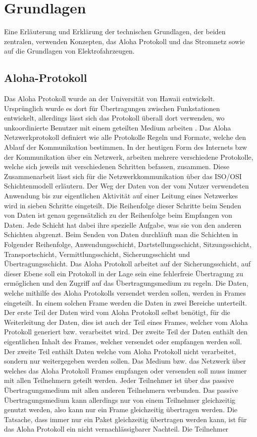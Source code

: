 \chapter{Grundlagen}
\label{chap:grundlagen}

Eine Erläuterung und Erklärung der technischen Grundlagen, der beiden zentralen, verwenden Konzepten, das Aloha Protokoll und das Stromnetz sowie auf die Grundlagen von Elektrofahrzeugen.
\section{Aloha-Protokoll}
Das Aloha Protokoll wurde an der Universität von Hawaii entwickelt. Ursprünglich wurde es dort für Übertragungen zwischen Funkstationen entwickelt, allerdings lässt sich das Protokoll überall dort verwenden, wo unkoordinierte Benutzer mit einem geteilten Medium arbeiten \cite{Back_AlohaPure}. Das Aloha Netzwerkprotokoll definiert wie alle Protokolle Regeln und Formate, welche den Ablauf der Kommunikation bestimmen. In der heutigen Form des Internets bzw der Kommunikation über ein Netzwerk, arbeiten mehrere verschiedene Protokolle, welche sich jeweils mit verschiedenen Schritten befassen, zusammen. Diese Zusammenarbeit lässt sich für die Netzwerkkommunikation über das ISO/OSI Schichtenmodell erläutern. Der Weg der Daten von der vom Nutzer verwendeten Anwendung bis zur eigentlichen Aktivität auf einer Leitung eines Netzwerkes wird in sieben Schritte eingeteilt. Die Reihenfolge dieser Schritte beim Senden von Daten ist genau gegensätzlich zu der Reihenfolge beim Empfangen von Daten. Jede Schicht hat dabei ihre spezielle Aufgabe, was sie von den anderen Schichten abgrenzt. Beim Senden von Daten durchläuft man die Schichten in Folgender Reihenfolge, Anwendungsschicht, Dartstellungsschicht, Sitzungsschicht, Transportschicht, Vermittlungsschicht, Sicherungsschicht und Übertragungsschicht. Das Aloha Protokoll arbeitet auf der Sicherungsschicht, auf dieser Ebene soll ein Protokoll in der Lage sein eine fehlerfreie Übertragung zu ermöglichen und den Zugriff auf das Übertragungsmedium zu regeln. Die Daten, welche mithilfe des Aloha Protokolls versendet werden sollen, werden in Frames eingeteilt. In einem solchen Frame werden die Daten in zwei Bereiche unterteilt. Der erste Teil der Daten wird vom Aloha Protokoll selbst benötigt, für die Weiterleitung der Daten, dies ist auch der Teil eines Frames, welcher vom Aloha Protokoll generiert bzw. verarbeitet wird. Der zweite Teil der Daten enthält den eigentlichen Inhalt des Frames, welcher versendet oder empfangen werden soll. Der zweite Teil enthält Daten welche vom Aloha Protokoll nicht verarbeitet, sondern nur weitergegeben werden sollen. Das Medium bzw. das Netzwerk über welches das Aloha Protokoll Frames empfangen oder versenden soll muss immer mit allen Teilnehmern geteilt werden. Jeder Teilnehmer ist über das passive Übertragungsmedium mit allen anderen Teilnehmern verbunden. Das passive Übertragungsmedium kann allerdings nur von einem Teilnehmer gleichzeitig genutzt werden, also kann nur ein Frame gleichzeitig übertragen werden. Die Tatsache, dass immer nur ein Paket gleichzeitig übertragen werden kann, ist für das Aloha Protokoll ein nicht vernachlässigbarer Nachteil. Die Teilnehmer 